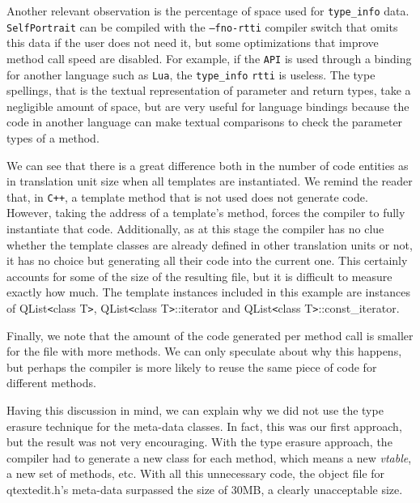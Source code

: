 Another relevant observation is the percentage of space used for \texttt{type\_info} data. \texttt{SelfPortrait} can be compiled
with the \texttt{--fno-rtti} compiler switch that omits this data if the user does not need it, but some optimizations that improve
method call speed are disabled. For example, if the \texttt{API} is used through a binding for another language such as \texttt{Lua},
the \texttt{type\_info} \texttt{rtti} is useless. The type spellings, that is the textual representation of parameter and return types,
take a negligible amount of space, but are very useful for language bindings because the code in another language can make textual
comparisons to check the parameter types of a method.

We can see that there is a great difference both in the number of code entities as in translation unit size when all templates
are instantiated. We remind the reader that, in \texttt{C++}, a template method that is not used does not generate code. However, taking the
address of a template's method, forces the compiler to fully instantiate that code. Additionally, as at this stage the compiler has no clue
whether the template classes are already defined in other translation units or not, it has no choice but generating all their code
into the current one. This certainly accounts for some of the size of the resulting file, but it is difficult to measure exactly how much.
The template instances included in this example are instances of QList\verb|<|class T\verb|>|, QList\verb|<|class T\verb|>|::iterator and
QList\verb|<|class T\verb|>|::const\_iterator.

Finally, we note that the amount of the code generated per method call is smaller for the file with more methods. We can only 
speculate about why this happens, but perhaps the compiler is more likely to reuse the same piece of code for
different methods.

Having this discussion in mind, we can explain why we did not use the type erasure technique for the meta-data classes.
In fact, this was our first approach, but the result was not very encouraging. With the type erasure approach, the compiler
had to generate a new class for each method, which means a new \emph{vtable}, a new set of methods, etc. With all this unnecessary
code, the object file for qtextedit.h's meta-data surpassed the size of 30MB, a clearly unacceptable size.

